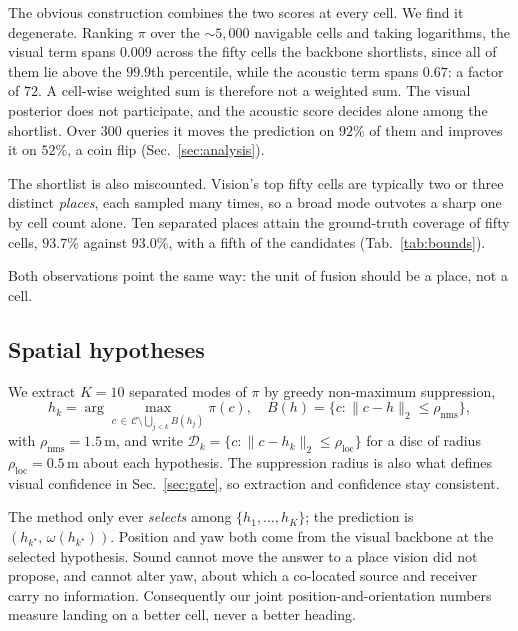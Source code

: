 The obvious construction combines the two scores at every cell. We find it
degenerate. Ranking $\pi$ over the $\sim\!5{,}000$ navigable cells and taking
logarithms, the visual term spans $0.009$ across the fifty cells the backbone
shortlists, since all of them lie above the $99.9$th percentile, while the
acoustic term spans $0.67$: a factor of $72$. A cell-wise weighted sum is
therefore not a weighted sum. The visual posterior does not participate, and the
acoustic score decides alone among the shortlist. Over $300$ queries it moves
the prediction on $92\%$ of them and improves it on $52\%$, a coin flip
(Sec.~\ref{sec:analysis}).

The shortlist is also miscounted. Vision's top fifty cells are typically two or
three distinct \emph{places}, each sampled many times, so a broad mode outvotes
a sharp one by cell count alone. Ten separated places attain the ground-truth
coverage of fifty cells, $93.7\%$ against $93.0\%$, with a fifth of the
candidates (Tab.~\ref{tab:bounds}).

Both observations point the same way: the unit of fusion should be a place, not
a cell.

\subsection{Spatial hypotheses}
\label{sec:hypotheses}

We extract $K{=}10$ separated modes of $\pi$ by greedy non-maximum suppression,
%
\begin{equation}
  h_k = \!\!\arg\max_{c \,\in\, \mathcal{C} \setminus \bigcup_{j<k} B(h_j)}\!\! \pi(c),
  \quad
  B(h) = \{ c : \| c - h \|_2 \le \rho_{\mathrm{nms}} \},
  \label{eq:nms}
\end{equation}
%
with $\rho_{\mathrm{nms}}{=}1.5$\,m, and write
$\mathcal{D}_k = \{c : \|c - h_k\|_2 \le \rho_{\mathrm{loc}}\}$ for a disc of
radius $\rho_{\mathrm{loc}}{=}0.5$\,m about each hypothesis. The suppression
radius is also what defines visual confidence in Sec.~\ref{sec:gate}, so
extraction and confidence stay consistent.

The method only ever \emph{selects} among $\{h_1,\dots,h_K\}$; the prediction is
$(h_{k^\star},\, \omega(h_{k^\star}))$. Position and yaw both come from the
visual backbone at the selected hypothesis. Sound cannot move the answer to a
place vision did not propose, and cannot alter yaw, about which a co-located
source and receiver carry no information. Consequently our joint
position-and-orientation numbers measure landing on a better cell, never a
better heading.

